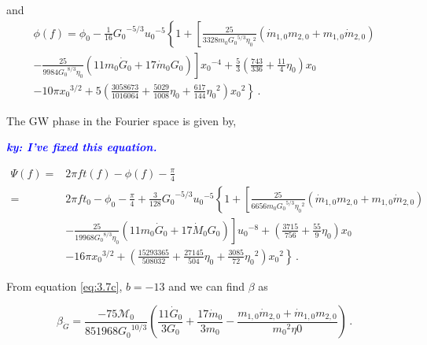 \documentclass[prd,twocolumn,nofootinbib]{revtex4-1}
\newcommand{\ky}[1]{\textcolor{blue}{\it{\textbf{ky: #1}}} }
\begin{document}
and
\begin{align}
\phi(f)=\phi_0-\frac{1}{16}{G_0}^{-5/3}{u_0}^{-5}\left\{1+\left[\frac{25}{3328 m_0 {G_0}^{5/3}{\eta_0}^2}(\dot{m}_{1,0}m_{2,0}+m_{1,0}\dot{m}_{2,0}) \right. \right. \nonumber\\ \left. \left. -\frac{25}{9984{G_0}^{8/3} \eta_0}(11m_0 \dot{G}_0+17\dot{m}_0 G_0)\right]{x_0}^{-4}+\frac{5}{3}\left(\frac{743}{336}+\frac{11}{4}{\eta_0}\right){x_0} \right. \nonumber\\ \left. -10 \pi {x_0}^{3/2}+5\left(\frac{3058673}{1016064}+\frac{5029}{1008}{\eta_0}+\frac{617}{144}{\eta_0}^{2}\right){x_0}^2\right\}\,.
\end{align}


\hspace{15.5pt}The GW phase in the Fourier space is given by,

\ky{I've fixed this equation.}

\begin{align}\label{eq:3.7c}
\Psi(f)=&2\pi ft(f)-\phi(f)-\frac{\pi}{4}\nonumber\\
=&2\pi f t_0-\phi_0-\frac{\pi}{4}+\frac{3}{128}{G_0}^{-5/3}{u_0}^{-5}\left\{1+\left[\frac{25}{6656m_0 {G_0}^{5/3}{\eta_0}^2}(\dot{m}_{1,0}m_{2,0}+m_{1,0}\dot{m}_{2,0}) \right. \right. \nonumber\\ 
&\left. \left. -\frac{25}{19968{G_0}^{8/3}\eta_0}(11m_0\dot{G}_0+17\dot{M}_0G_0)\right]{u_0}^{-8}+\left(\frac{3715}{756} +\frac{55}{9}{\eta_0}\right){x_0} \right. \nonumber\\ 
& \left. -16\pi {x_0}^{3/2}+\left(\frac{15293365}{508032}+\frac{27145}{504}{\eta_0}+\frac{3085}{72}{\eta_0}^2\right){x_0}^2\right\}\,.
\end{align}


\hspace*{15.5pt}From equation \eqref{eq:3.7c}, $b=-13$  and we can find $\beta$ as

 \begin{equation}
 \beta_{\dot{G}}=\frac{-75 \mathcal{M}_0}{851968 {G_0}^{10/3}} \left(\frac{11 \dot{G}_0}{3 G_0} + \frac{17 \dot{m}_0}{3m_0}-\frac{m_{1,0}\dot{m}_{2,0}+\dot{m}_{1,0}m_{2,0}}{{m_0}^2 \eta0}\right)\,.
  \end{equation}
 
\end{document}
